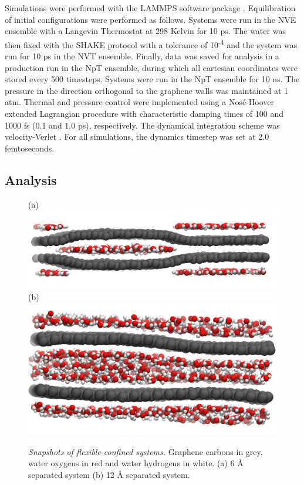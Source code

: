 \documentclass[12pt]{article}
\begin{document}
Simulations were performed with the LAMMPS software package \cite{Plimpton1995}. 
Equilibration of initial configurations were performed as follows. Systems were run in 
the NVE ensemble with a Langevin Thermostat at 298 Kelvin
for 10 ps. The water was then fixed with the SHAKE protocol \cite{Andersen1983} with a tolerance
of 10\textsuperscript{-4} and the system was run for 10 ps in the NVT ensemble.
Finally, data was saved for analysis in a production run in the NpT ensemble,
during which all cartesian coordinates were stored every 500 timesteps. 
Systems were run in the NpT ensemble for 10 ns. The 
pressure in the direction orthogonal to the graphene walls was maintained at 1 atm.
Thermal and pressure control were implemented using a Nos\' e-Hoover 
extended Lagrangian procedure \cite{Martyna1994} with characteristic damping times of 100 
and 1000 fs (0.1 and 1.0 ps), respectively. The dynamical integration 
scheme was velocity-Verlet \cite{Swope1982}.
For all simulations, the dynamics timestep was set at 2.0 femtoseconds. 

\subsection*{Analysis}

\begin{figure}[h!]
	\centering
	(a)~\includegraphics[width=0.45\linewidth]{d6L46_side} 
	(b)~\includegraphics[width=0.40\linewidth]{d12L46_side}
	\vspace{-10pt}
	\caption{\textit{Snapshots of flexible confined systems.} Graphene carbons in grey, water oxygens in red and water hydrogens in white. (a) 6 \r A separated system (b) 12 \r A separated system. }
	\label{fig:chem_forms}
\end{figure}




\clearpage
\printbibliography
\end{document}
